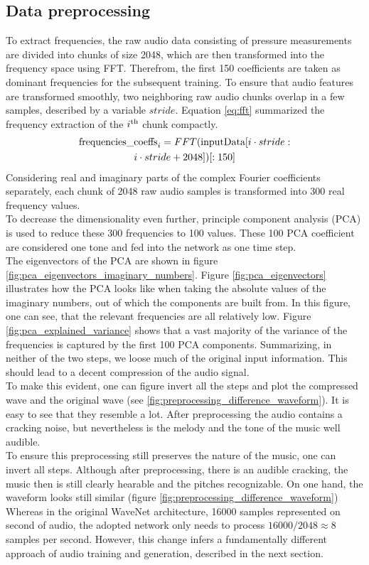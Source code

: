\documentclass[10pt,conference,compsocconf]{IEEEtran}
\begin{document}
\subsection{Data preprocessing}
To extract frequencies, the raw audio data consisting of pressure measurements are divided into chunks of size 2048, which are then transformed into the frequency space using FFT. Therefrom, the first 150 coefficients are taken as dominant frequencies for the subsequent training. To ensure that audio features are transformed smoothly, two neighboring raw audio chunks overlap in a few samples, described by a variable $stride$. Equation \ref{eq:fft} summarized the frequency extraction of the $i^\textnormal{th}$ chunk compactly.
\begin{multline}\label{eq:fft}
\textnormal{frequencies\_coeffs}_i =
FFT(\textnormal{inputData}[i \cdot stride:\\i \cdot stride+2048])[:150]
\end{multline}
Considering real and imaginary parts of the complex Fourier coefficients separately, each chunk of 2048 raw audio samples is transformed into 300 real frequency values.\\
To decrease the dimensionality even further, principle component analysis (PCA) is used to reduce these 300 frequencies to 100 values.
These 100 PCA coefficient are considered one tone and fed into the network as one time step.\\
The eigenvectors of the PCA are shown in figure \ref{fig:pca_eigenvectors_imaginary_numbers}. Figure \ref{fig:pca_eigenvectors} illustrates how the PCA looks like when taking the absolute values of the imaginary numbers, out of which the components are built from. In this figure, one can see, that the relevant frequencies are all relatively low. Figure \ref{fig:pca_explained_variance} shows that a vast majority of the variance of the frequencies is captured by the first 100 PCA components. Summarizing, in neither of the two steps, we loose much of the original input information. This should lead to a decent compression of the audio signal.\\
To make this evident, one can figure invert all the steps and plot the compressed wave and the original wave (see \ref{fig:preprocessing_difference_waveform}). It is easy to see that they resemble a lot. After preprocessing the audio contains a cracking noise, but nevertheless is the melody and the tone of the music well audible.\\
To ensure this preprocessing still preserves the nature of the music, one can invert all steps. Although after preprocessing, there is an audible cracking, the music then is still clearly hearable and the pitches recognizable.
On one hand, the waveform looks still similar (figure \ref{fig:preprocessing_difference_waveform})
Whereas in the original WaveNet architecture, 16000 samples represented on second of audio, the adopted network only needs to process $16000/2048 \approx 8$ samples per second. However, this change infers a fundamentally different approach of audio training and generation, described in the next section. 
\end{document}
